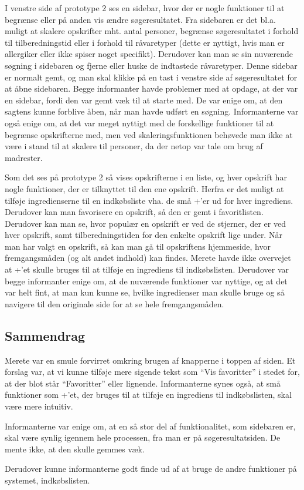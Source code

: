 I venstre side af prototype 2 ses en sidebar, hvor der er nogle funktioner til at begrænse eller på anden vis ændre søgeresultatet. Fra sidebaren er det bl.a. muligt at skalere opskrifter mht. antal personer, begrænse søgeresultatet i forhold til tilberedningstid eller i forhold til råvaretyper (dette er nyttigt, hvis man \fx er allergiker eller ikke spiser noget specifikt). Derudover kan man se sin nuværende søgning i sidebaren og fjerne eller huske de indtastede råvaretyper. Denne sidebar er normalt gemt, og man skal klikke på en tast i venstre side af søgeresultatet for at åbne sidebaren. Begge informanter havde problemer med at opdage, at der var en sidebar, fordi den var gemt væk til at starte med. De var enige om, at den sagtens kunne forblive åben, når man havde udført en søgning. Informanterne var også enige om, at det var meget nyttigt med de forskellige funktioner til at begrænse opskrifterne med, men \fx ved skaleringsfunktionen behøvede man ikke at være i stand til at skalere til  personer, da der netop var tale om brug af madrester. 

Som det ses på prototype 2 så vises opskrifterne i en liste, og hver opskrift har nogle funktioner, der er tilknyttet til den ene opskrift. Herfra er det muligt at tilføje ingredienserne til en indkøbsliste vha. de små +'er ud for hver ingrediens. Derudover kan man favorisere en opskrift, så den er gemt i favoritlisten. Derudover kan man se, hvor populær en opskrift er ved de stjerner, der er ved hver opskrift, samt tilberedningstiden for den enkelte opskrift lige under. Når man har valgt en opskrift, så kan man gå til opskriftens hjemmeside, hvor fremgangsmåden (og alt andet indhold) kan findes. Merete havde ikke overvejet at +'et skulle bruges til at tilføje en ingrediens til indkøbslisten. Derudover var begge informanter enige om, at de nuværende funktioner var nyttige, og at det var helt fint, at man kun kunne se, hvilke ingredienser man skulle bruge og så navigere til den originale side for at se hele fremgangsmåden.

\subsection{Sammendrag}
Merete var en smule forvirret omkring brugen af knapperne i toppen af siden. Et forslag var, at vi kunne tilføje mere sigende tekst som ``Vis favoritter'' i stedet for, at der blot står ``Favoritter'' eller lignende. Informanterne synes også, at små funktioner som +'et, der bruges til at tilføje en ingrediens til indkøbslisten, skal være mere intuitiv.

Informanterne var enige om, at en så stor del af funktionalitet, som sidebaren er, skal være synlig igennem hele processen, fra man er på søgeresultatsiden. De mente ikke, at den skulle gemmes væk.

Derudover kunne informanterne godt finde ud af at bruge de andre funktioner på systemet, \fx indkøbslisten.
